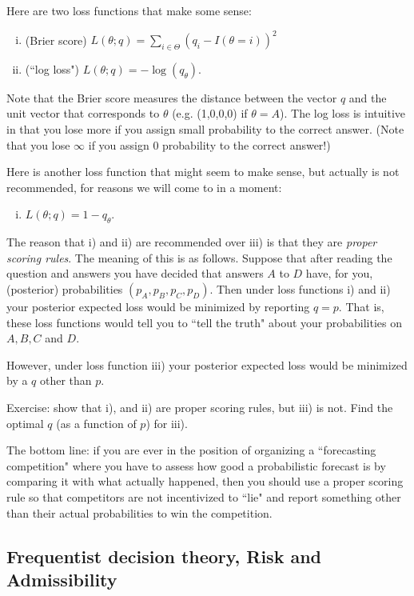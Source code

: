 \documentclass[12pt]{article}
\begin{document}
\begin{enumerate}
Here are two loss functions that make some sense:
\begin{enumerate}[i)]
\item (Brier score) $L(\theta;q) = \sum_{i \in \Theta} (q_i - I(\theta=i))^2$
\item (``log loss")  $L(\theta;q) = -\log(q_\theta)$.
\end{enumerate}
Note that the Brier score measures the distance between the vector $q$ and the unit vector that corresponds to $\theta$ (e.g. (1,0,0,0) 
if $\theta=A$). The log loss is intuitive in that you lose more if you assign small probability to the correct answer.
(Note that you lose $\infty$ if you assign 0 probability to the correct answer!)

Here is another loss function that might seem to make sense, but actually is not recommended,
for reasons we will come to in a moment:
\begin{enumerate}[iii)]
\item $L(\theta;q) = 1-q_\theta$.
\end{enumerate}
The reason that i) and ii) are recommended over iii) is that they are {\it proper scoring rules}.
The meaning of this is as follows. Suppose that after reading the question and answers you have decided that
answers $A$ to $D$ have, for you,  (posterior) probabilities $(p_A,p_B,p_C,p_D)$. 
Then under loss functions i) and ii) your posterior expected loss would be minimized by reporting $q=p$.
That is, these loss functions would tell you to ``tell the truth" about your probabilities on $A,B,C$ and $D$.

However, under loss function iii) your posterior expected loss would be minimized by a $q$ other than $p$.

Exercise: show that i), and ii) are proper scoring rules, but iii) is not. Find the optimal $q$ (as a function of $p$) for iii).

The bottom line: if you are ever in the position of organizing a ``forecasting competition" where you have to assess
how good a probabilistic forecast is by comparing it with what actually happened, then you should use a proper scoring rule
so that competitors are not  incentivized to ``lie" and report something other than their actual probabilities to win the competition.
\end{enumerate}

\subsection{Frequentist decision theory, Risk and Admissibility}
\end{document}
